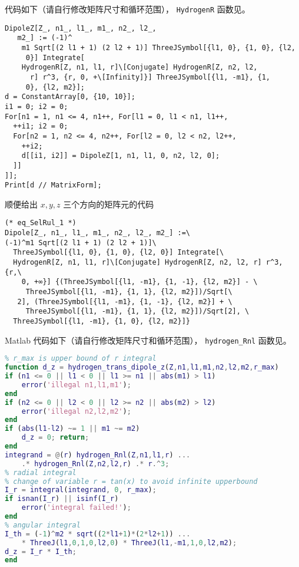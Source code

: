  代码如下（请自行修改矩阵尺寸和循环范围）， \verb`HydrogenR` 函数见。
\begin{lstlisting}[language=mma,caption=DipoleZ.m]
DipoleZ[Z_, n1_, l1_, m1_, n2_, l2_, 
   m2_] := (-1)^
    m1 Sqrt[(2 l1 + 1) (2 l2 + 1)] ThreeJSymbol[{l1, 0}, {1, 0}, {l2, 
     0}] Integrate[
    HydrogenR[Z, n1, l1, r]\[Conjugate] HydrogenR[Z, n2, l2, 
      r] r^3, {r, 0, +\[Infinity]}] ThreeJSymbol[{l1, -m1}, {1, 
     0}, {l2, m2}];
d = ConstantArray[0, {10, 10}];
i1 = 0; i2 = 0;
For[n1 = 1, n1 <= 4, n1++, For[l1 = 0, l1 < n1, l1++,
  ++i1; i2 = 0;
  For[n2 = 1, n2 <= 4, n2++, For[l2 = 0, l2 < n2, l2++,
    ++i2;
    d[[i1, i2]] = DipoleZ[1, n1, l1, 0, n2, l2, 0];
  ]]
]];
Print[d // MatrixForm];
\end{lstlisting}
顺便给出 $x,y,z$ 三个方向的矩阵元的代码
\begin{lstlisting}[language=mma, caption=Dipole.m]
(* eq_SelRul_1 *)
Dipole[Z_, n1_, l1_, m1_, n2_, l2_, m2_] :=\
(-1)^m1 Sqrt[(2 l1 + 1) (2 l2 + 1)]\
  ThreeJSymbol[{l1, 0}, {1, 0}, {l2, 0}] Integrate[\
  HydrogenR[Z, n1, l1, r]\[Conjugate] HydrogenR[Z, n2, l2, r] r^3, {r,\
    0, +∞}] {(ThreeJSymbol[{l1, -m1}, {1, -1}, {l2, m2}] - \
     ThreeJSymbol[{l1, -m1}, {1, 1}, {l2, m2}])/Sqrt[\
   2], (ThreeJSymbol[{l1, -m1}, {1, -1}, {l2, m2}] + \
     ThreeJSymbol[{l1, -m1}, {1, 1}, {l2, m2}])/Sqrt[2], \
  ThreeJSymbol[{l1, -m1}, {1, 0}, {l2, m2}]}
\end{lstlisting}

Matlab 代码如下（请自行修改矩阵尺寸和循环范围）， \verb`hydrogen_Rnl` 函数见。
\begin{lstlisting}[language=matlab,caption=hydrogen\_dipole\_z.m]
% hydrogen <n1,l1,m1|z|n2,l2,m2>
% r_max is upper bound of r integral
function d_z = hydrogen_trans_dipole_z(Z,n1,l1,m1,n2,l2,m2,r_max)
if (n1 <= 0 || l1 < 0 || l1 >= n1 || abs(m1) > l1)
    error('illegal n1,l1,m1');
end
if (n2 <= 0 || l2 < 0 || l2 >= n2 || abs(m2) > l2)
    error('illegal n2,l2,m2');
end
if (abs(l1-l2) ~= 1 || m1 ~= m2)
    d_z = 0; return;
end
integrand = @(r) hydrogen_Rnl(Z,n1,l1,r) ...
    .* hydrogen_Rnl(Z,n2,l2,r) .* r.^3;
% radial integral
% change of variable r = tan(x) to avoid infinite upperbound
I_r = integral(integrand, 0, r_max);
if isnan(I_r) || isinf(I_r)
    error('integral failed!');
end
% angular integral
I_th = (-1)^m2 * sqrt((2*l1+1)*(2*l2+1)) ...
    * ThreeJ(l1,0,1,0,l2,0) * ThreeJ(l1,-m1,1,0,l2,m2);
d_z = I_r * I_th;
end
\end{lstlisting}


